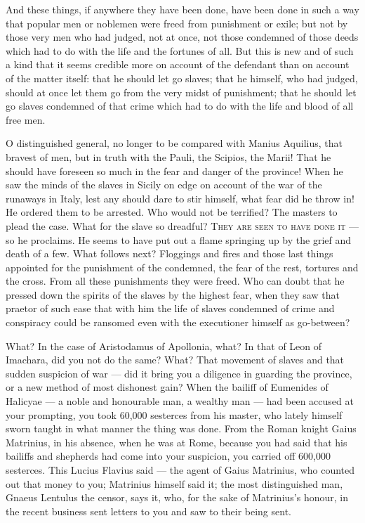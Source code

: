  And these things, if anywhere they have been done, have been done in such a way that popular men or noblemen were freed from punishment or exile; but not by those very men who had judged, not at once, not those condemned of those deeds which had to do with the life and the fortunes of all. But this is new and of such a kind that it seems credible more on account of the defendant than on account of the matter itself: that he should let go slaves; that he himself, who had judged, should at once let them go from the very midst of punishment; that he should let go slaves condemned of that crime which had to do with the life and blood of all free men.

 O distinguished general, no longer to be compared with Manius Aquilius, that bravest of men, but in truth with the Pauli, the Scipios, the Marii! That he should have foreseen so much in the fear and danger of the province! When he saw the minds of the slaves in Sicily on edge on account of the war of the runaways in Italy, lest any should dare to stir himself, what fear did he throw in! He ordered them to be arrested. Who would not be terrified? The masters to plead the case. What for the slave so dreadful? \textsc{They are seen to have done it} --- so he proclaims. He seems to have put out a flame springing up by the grief and death of a few. What follows next? Floggings and fires and those last things appointed for the punishment of the condemned, the fear of the rest, tortures and the cross. From all these punishments they were freed. Who can doubt that he pressed down the spirits of the slaves by the highest fear, when they saw that praetor of such ease that with him the life of slaves condemned of crime and conspiracy could be ransomed even with the executioner himself as go-between?

 What? In the case of Aristodamus of Apollonia, what? In that of Leon of Imachara, did you not do the same? What? That movement of slaves and that sudden suspicion of war --- did it bring you a diligence in guarding the province, or a new method of most dishonest gain? When the bailiff of Eumenides of Halicyae --- a noble and honourable man, a wealthy man --- had been accused at your prompting, you took 60,000 sesterces from his master, who lately himself sworn taught in what manner the thing was done. From the Roman knight Gaius Matrinius, in his absence, when he was at Rome, because you had said that his bailiffs and shepherds had come into your suspicion, you carried off 600,000 sesterces. This Lucius Flavius said --- the agent of Gaius Matrinius, who counted out that money to you; Matrinius himself said it; the most distinguished man, Gnaeus Lentulus the censor, says it, who, for the sake of Matrinius's honour, in the recent business sent letters to you and saw to their being sent.


